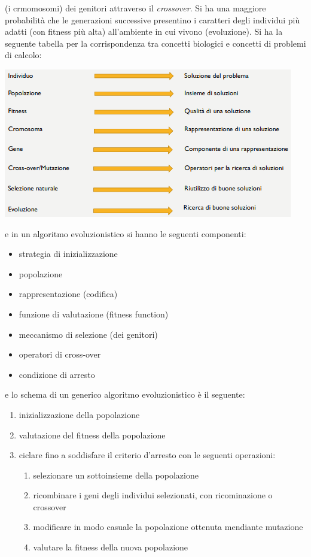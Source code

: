 \documentclass[a4paper,12pt, oneside]{book}
\begin{document}
(i crmomosomi) dei genitori attraverso il
\textit{crossover}. Si ha una maggiore probabilità che le generazioni
successive presentino i caratteri degli individui più adatti (con
fitness più alta) all’ambiente in cui vivono (evoluzione). Si ha la
seguente tabella per la corrispondenza tra concetti biologici e
concetti di problemi di calcolo:
\begin{center}
  \includegraphics[scale = 0.7]{img/bio.png}
\end{center}
e in un algoritmo evoluzionistico si hanno le seguenti componenti:
\begin{itemize}
  \item strategia di inizializzazione
  \item popolazione
  \item rappresentazione (codifica)
  \item funzione di valutazione (fitness function)
  \item meccanismo di selezione (dei genitori)
  \item operatori di cross-over
  \item condizione di arresto
\end{itemize}
e lo schema di un generico algoritmo evoluzionistico è il seguente:
\begin{enumerate}
  \item inizializzazione della popolazione
  \item valutazione del fitness della popolazione
  \item ciclare fino a soddisfare il criterio d'arresto con le
  seguenti operazioni:
  \begin{enumerate}
    \item selezionare un sottoinsieme della popolazione
    \item ricombinare i geni degli individui selezionati, con
    ricominazione o crossover
    \item modificare in modo casuale la popolazione ottenuta mendiante
    mutazione
    \item valutare la fitness della nuova popolazione
  \end{enumerate}
\end{enumerate}
\end{document}
